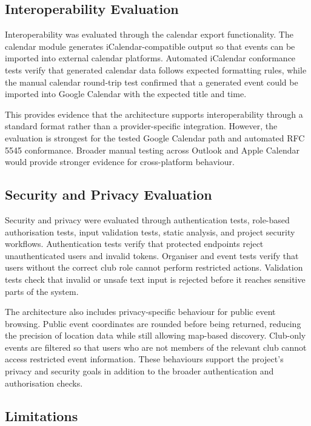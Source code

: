 \subsection{Interoperability Evaluation}

Interoperability was evaluated through the calendar export functionality. The calendar module generates iCalendar-compatible output so that events can be imported into external calendar platforms. Automated iCalendar conformance tests verify that generated calendar data follows expected formatting rules, while the manual calendar round-trip test confirmed that a generated event could be imported into Google Calendar with the expected title and time.

This provides evidence that the architecture supports interoperability through a standard format rather than a provider-specific integration. However, the evaluation is strongest for the tested Google Calendar path and automated RFC 5545 conformance. Broader manual testing across Outlook and Apple Calendar would provide stronger evidence for cross-platform behaviour.

\subsection{Security and Privacy Evaluation}

Security and privacy were evaluated through authentication tests, role-based authorisation tests, input validation tests, static analysis, and project security workflows. Authentication tests verify that protected endpoints reject unauthenticated users and invalid tokens. Organiser and event tests verify that users without the correct club role cannot perform restricted actions. Validation tests check that invalid or unsafe text input is rejected before it reaches sensitive parts of the system.

The architecture also includes privacy-specific behaviour for public event browsing. Public event coordinates are rounded before being returned, reducing the precision of location data while still allowing map-based discovery. Club-only events are filtered so that users who are not members of the relevant club cannot access restricted event information. These behaviours support the project's privacy and security goals in addition to the broader authentication and authorisation checks.

\subsection{Limitations}

